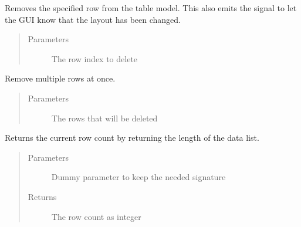 \documentclass[letterpaper,10pt,english]{sphinxmanual}
\begin{document}
\begin{fulllineitems}
\begin{fulllineitems}
\label{\detokenize{src:src.PacketTableModel.PacketTableModel.removeRow}}
Removes the specified row from the table model.
This also emits the  signal to let the GUI know that the layout has been changed.
\begin{quote}\begin{description}
\item[{Parameters}] \leavevmode
{} \textendash{} The row index to delete

\end{description}\end{quote}

\end{fulllineitems}


\begin{fulllineitems}
\label{\detokenize{src:src.PacketTableModel.PacketTableModel.removeRows}}
Remove multiple rows at once.
\begin{quote}\begin{description}
\item[{Parameters}] \leavevmode
{} \textendash{} The rows that will be deleted

\end{description}\end{quote}

\end{fulllineitems}


\begin{fulllineitems}
\label{\detokenize{src:src.PacketTableModel.PacketTableModel.rowCount}}
Returns the current row count by returning the length of the data list.
\begin{quote}\begin{description}
\item[{Parameters}] \leavevmode
{} \textendash{} Dummy parameter to keep the needed signature

\item[{Returns}] \leavevmode
The row count as integer


\end{description}
\end{quote}
\end{fulllineitems}
\end{fulllineitems}
\end{document}
